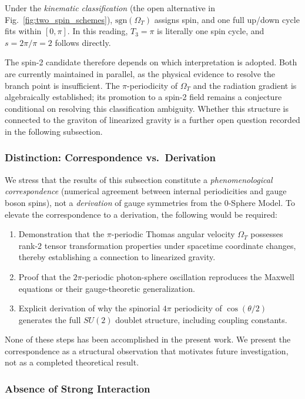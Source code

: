 \documentclass[%
 reprint,
 amsmath,amssymb,
 aps,
 prb,
]{revtex4-2}
\numberwithin{equation}{section}
\theoremstyle{definition}
\theoremstyle{remark}
\begin{document}
Under the \emph{kinematic classification} (the open alternative in Fig.~\ref{fig:two_spin_schemes}), $\mathrm{sgn}(\Omega_T)$ assigns spin, and one full up/down cycle fits within $[0,\pi]$. In this reading, $T_3 = \pi$ is literally one spin cycle, and $s = 2\pi/\pi = 2$ follows directly.

The spin-2 candidate therefore depends on which interpretation is adopted. Both are currently maintained in parallel, as the physical evidence to resolve the branch point is insufficient. The $\pi$-periodicity of $\Omega_T$ and the radiation gradient is algebraically established; its promotion to a spin-2 field remains a conjecture conditional on resolving this classification ambiguity. Whether this structure is connected to the graviton of linearized gravity is a further open question recorded in the following subsection.

\subsubsection{Distinction: Correspondence vs.~Derivation}

We stress that the results of this subsection constitute a \emph{phenomenological correspondence} (numerical agreement between internal periodicities and gauge boson spins), not a \emph{derivation} of gauge symmetries from the 0-Sphere Model. To elevate the correspondence to a derivation, the following would be required:
\begin{enumerate}
\item Demonstration that the $\pi$-periodic Thomas angular velocity $\Omega_T$ possesses rank-2 tensor transformation properties under spacetime coordinate changes, thereby establishing a connection to linearized gravity.
\item Proof that the $2\pi$-periodic photon-sphere oscillation reproduces the Maxwell equations or their gauge-theoretic generalization.
\item Explicit derivation of why the spinorial $4\pi$ periodicity of $\cos(\theta/2)$ generates the full $SU(2)$ doublet structure, including coupling constants.
\end{enumerate}
None of these steps has been accomplished in the present work. We present the correspondence as a structural observation that motivates future investigation, not as a completed theoretical result.

\subsubsection{Absence of Strong Interaction}
\end{document}
